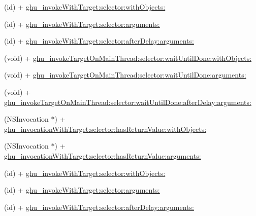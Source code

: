 \begin{DoxyCompactItemize}
\item 
(id) + \hyperlink{interface_n_s_invocation_07_g_h_utils___g_h_u_n_i_t_08_af60de644c62297e237a21adf2ea75e80}{ghu\-\_\-invoke\-With\-Target\-:selector\-:with\-Objects\-:}
\item 
(id) + \hyperlink{interface_n_s_invocation_07_g_h_utils___g_h_u_n_i_t_08_a0aa9a0433b00c60a8174c7bed363821f}{ghu\-\_\-invoke\-With\-Target\-:selector\-:arguments\-:}
\item 
(id) + \hyperlink{interface_n_s_invocation_07_g_h_utils___g_h_u_n_i_t_08_a7f856b1af207762c610e597941411091}{ghu\-\_\-invoke\-With\-Target\-:selector\-:after\-Delay\-:arguments\-:}
\item 
(void) + \hyperlink{interface_n_s_invocation_07_g_h_utils___g_h_u_n_i_t_08_a6933a1f0fd7d0d4b8f133baf53f30a31}{ghu\-\_\-invoke\-Target\-On\-Main\-Thread\-:selector\-:wait\-Until\-Done\-:with\-Objects\-:}
\item 
(void) + \hyperlink{interface_n_s_invocation_07_g_h_utils___g_h_u_n_i_t_08_a261cd5aa6061478716fba4f79cb4f69b}{ghu\-\_\-invoke\-Target\-On\-Main\-Thread\-:selector\-:wait\-Until\-Done\-:arguments\-:}
\item 
(void) + \hyperlink{interface_n_s_invocation_07_g_h_utils___g_h_u_n_i_t_08_a0b891f27c084f6677907e0f907caf5f9}{ghu\-\_\-invoke\-Target\-On\-Main\-Thread\-:selector\-:wait\-Until\-Done\-:after\-Delay\-:arguments\-:}
\item 
(\-N\-S\-Invocation $\ast$) + \hyperlink{interface_n_s_invocation_07_g_h_utils___g_h_u_n_i_t_08_a31d3598ec7e21face3cb783c2c60b42c}{ghu\-\_\-invocation\-With\-Target\-:selector\-:has\-Return\-Value\-:with\-Objects\-:}
\item 
(\-N\-S\-Invocation $\ast$) + \hyperlink{interface_n_s_invocation_07_g_h_utils___g_h_u_n_i_t_08_a64dcd5d1f117118b02213db0846092d9}{ghu\-\_\-invocation\-With\-Target\-:selector\-:has\-Return\-Value\-:arguments\-:}
\item 
(id) + \hyperlink{interface_n_s_invocation_07_g_h_utils___g_h_u_n_i_t_08_af60de644c62297e237a21adf2ea75e80}{ghu\-\_\-invoke\-With\-Target\-:selector\-:with\-Objects\-:}
\item 
(id) + \hyperlink{interface_n_s_invocation_07_g_h_utils___g_h_u_n_i_t_08_a0aa9a0433b00c60a8174c7bed363821f}{ghu\-\_\-invoke\-With\-Target\-:selector\-:arguments\-:}
\item 
(id) + \hyperlink{interface_n_s_invocation_07_g_h_utils___g_h_u_n_i_t_08_a7f856b1af207762c610e597941411091}{ghu\-\_\-invoke\-With\-Target\-:selector\-:after\-Delay\-:arguments\-:}
\item 

\end{DoxyCompactItemize}
